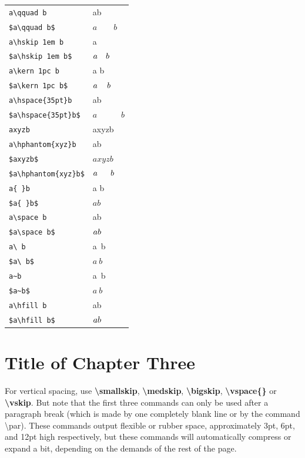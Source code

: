 \documentclass[12pt,openright]{book}
\begin{document}
\begin{center}
\begin{longtable}{p{}p{}}
  \verb|a\qquad b|               & a\qquad b \\
  \verb|$a\qquad b$|             & $a\qquad b$ \\
  \verb|a\hskip 1em b|           & a\hskip 1em b \\
  \verb|$a\hskip 1em b$|         & $a\hskip 1em b$ \\
  \verb|a\kern 1pc b|            & a\kern 1pc b \\
  \verb|$a\kern 1pc b$|          & $a\kern 1pc b$ \\
  \verb|a\hspace{35pt}b|         & a\hspace{35pt}b \\
  \verb|$a\hspace{35pt}b$|       & $a\hspace{35pt}b$ \\
  \verb|axyzb|                   & axyzb \\
  \verb|a\hphantom{xyz}b|        & a\hphantom{xyz}b \\
  \verb|$axyzb$|                 & $axyzb$ \\
  \verb|$a\hphantom{xyz}b$|      & $a\hphantom{xyz}b$ \\
  \verb|a{ }b|                   & a{ }b \\
  \verb|$a{ }b$|                 & $a{ }b$ \\
  \verb|a\space b|               & a\space b \\
  \verb|$a\space b$|             & $a\space b$ \\
  \verb|a\ b|                    & a\ b \\
  \verb|$a\ b$|                  & $a\ b$ \\
  \verb|a~b|                     & a~b \\
  \verb|$a~b$|                   & $a~b$ \\
  \verb|a\hfill b|               & a\hfill b \\
  \verb|$a\hfill b$|             & $a\hfill b$ \\
\end{longtable}
\end{center}

\chapter{Title of Chapter Three}

For vertical spacing, use \textbf{\textbackslash smallskip}, \textbf{\textbackslash medskip}, \textbf{\textbackslash bigskip}, \textbf{\textbackslash vspace\{\}} or \textbf{\textbackslash vskip}. But note that the first three commands can only be used after a paragraph break (which is made by one completely blank line or by the command \textbackslash par). These commands output flexible or rubber space, approximately 3pt, 6pt, and 12pt high respectively, but these commands will automatically compress or expand a bit, depending on the demands of the rest of the page.
\end{document}
